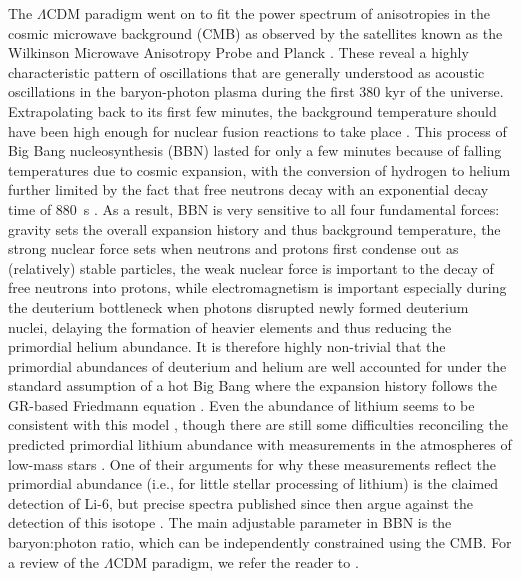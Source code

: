 \documentclass[fleqn,usenatbib,useAMS]{mnras} %
\begin{document}
The $\Lambda$CDM paradigm went on to fit the power spectrum of anisotropies in the cosmic microwave background (CMB) as observed by the satellites known as the Wilkinson Microwave Anisotropy Probe \citep[WMAP;][]{Spergel_2003} and Planck \citep{Planck_2014_cosmology}. These reveal a highly characteristic pattern of oscillations that are generally understood as acoustic oscillations in the baryon-photon plasma during the first 380 kyr of the universe. Extrapolating back to its first few minutes, the background temperature should have been high enough for nuclear fusion reactions to take place \citep*{Alpher_1948}. This process of Big Bang nucleosynthesis (BBN) lasted for only a few minutes because of falling temperatures due to cosmic expansion, with the conversion of hydrogen to helium further limited by the fact that free neutrons decay with an exponential decay time of 880~s \citep{Olive_2014}. As a result, BBN is very sensitive to all four fundamental forces: gravity sets the overall expansion history and thus background temperature, the strong nuclear force sets when neutrons and protons first condense out as (relatively) stable particles, the weak nuclear force is important to the decay of free neutrons into protons, while electromagnetism is important especially during the deuterium bottleneck when photons disrupted newly formed deuterium nuclei, delaying the formation of heavier elements and thus reducing the primordial helium abundance. It is therefore highly non-trivial that the primordial abundances of deuterium and helium are well accounted for under the standard assumption of a hot Big Bang where the expansion history follows the GR-based Friedmann equation \citep{Cyburt_2016}. Even the abundance of lithium seems to be consistent with this model \citep{Howk_2012, Fu_2015}, though there are still some difficulties reconciling the predicted primordial lithium abundance with measurements in the atmospheres of low-mass stars \citep[as reviewed in chapter 6 of][]{Merritt_2020}. One of their arguments for why these measurements reflect the primordial abundance (i.e., for little stellar processing of lithium) is the claimed detection of Li-6, but precise spectra published since then argue against the detection of this isotope \citep{Wang_2022_Li6}. The main adjustable parameter in BBN is the baryon:photon ratio, which can be independently constrained using the CMB. For a review of the $\Lambda$CDM paradigm, we refer the reader to \citet{Frenk_2012}.%
\end{document}
